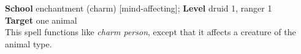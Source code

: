 \textbf{School} enchantment (charm) [mind-affecting]; \textbf{Level} druid 1, ranger 1\\
\textbf{Target} one animal\\
This spell functions like \textit{charm person}, except that it affects a creature of the animal type.\\
